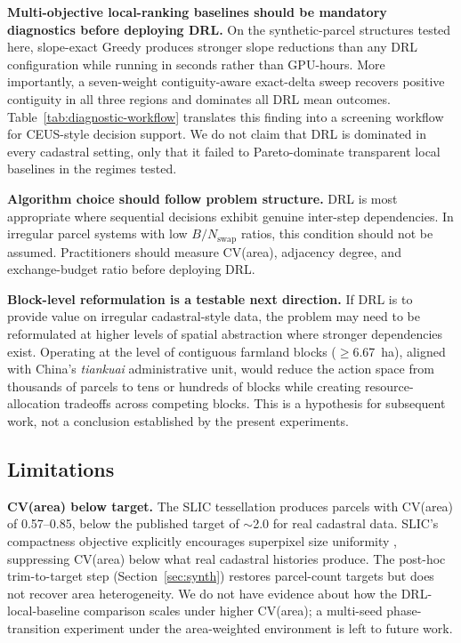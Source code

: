\documentclass[]{interact}
\theoremstyle{plain}
\begin{document}
\textbf{Multi-objective local-ranking baselines should be mandatory diagnostics before deploying DRL.} On the synthetic-parcel structures tested here, slope-exact Greedy produces stronger slope reductions than any DRL configuration while running in seconds rather than GPU-hours. More importantly, a seven-weight contiguity-aware exact-delta sweep recovers positive contiguity in all three regions and dominates all DRL mean outcomes. Table~\ref{tab:diagnostic-workflow} translates this finding into a screening workflow for CEUS-style decision support. We do not claim that DRL is dominated in every cadastral setting, only that it failed to Pareto-dominate transparent local baselines in the regimes tested.

\textbf{Algorithm choice should follow problem structure.} DRL is most appropriate where sequential decisions exhibit genuine inter-step dependencies. In irregular parcel systems with low $B / N_{\text{swap}}$ ratios, this condition should not be assumed. Practitioners should measure CV(area), adjacency degree, and exchange-budget ratio before deploying DRL.

\textbf{Block-level reformulation is a testable next direction.} If DRL is to provide value on irregular cadastral-style data, the problem may need to be reformulated at higher levels of spatial abstraction where stronger dependencies exist. Operating at the level of contiguous farmland blocks ($\geq$6.67~ha), aligned with China's \emph{tiankuai} administrative unit, would reduce the action space from thousands of parcels to tens or hundreds of blocks while creating resource-allocation tradeoffs across competing blocks. This is a hypothesis for subsequent work, not a conclusion established by the present experiments.

\subsection{Limitations}\label{sec:disc-limits}

\textbf{CV(area) below target.} The SLIC tessellation produces parcels with CV(area) of 0.57--0.85, below the published target of $\sim$2.0 for real cadastral data. SLIC's compactness objective explicitly encourages superpixel size uniformity \citep{achanta2012slic}, suppressing CV(area) below what real cadastral histories produce. The post-hoc trim-to-target step (Section~\ref{sec:synth}) restores parcel-count targets but does not recover area heterogeneity. We do not have evidence about how the DRL-local-baseline comparison scales under higher CV(area); a multi-seed phase-transition experiment under the area-weighted environment is left to future work.
\end{document}
